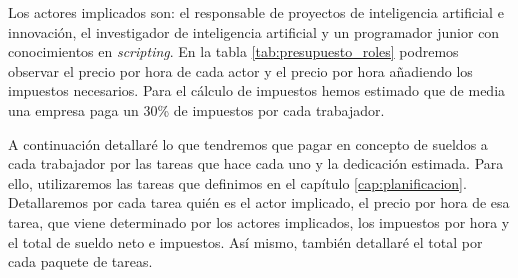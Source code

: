 Los actores implicados son: el responsable de proyectos de inteligencia artificial e innovación,
el investigador de inteligencia artificial y un programador junior con conocimientos en
\textit{scripting}. En la tabla \ref{tab:presupuesto_roles} podremos observar el precio
por hora de cada actor y el precio por hora añadiendo los impuestos necesarios. Para el
cálculo de impuestos hemos estimado que de media una empresa paga un 30\% de impuestos
por cada trabajador.

\begin{table}[H]
    \centering
    \caption[Salarios netos medios por hora para cada rol]{Salarios netos medios por hora para cada rol (\cite{Glassdoor})}
    \label{tab:presupuesto_roles}
\end{table}

A continuación detallaré lo que tendremos que pagar en concepto de sueldos a cada trabajador
por las tareas que hace cada uno y la dedicación estimada. Para ello, utilizaremos 
las tareas que definimos en el capítulo \ref{cap:planificacion}. Detallaremos por cada tarea
quién es el actor implicado, el precio por hora de esa tarea, que viene determinado
por los actores implicados, los impuestos por hora y el total de sueldo neto e impuestos.
Así mismo, también detallaré el total por cada paquete de tareas.

